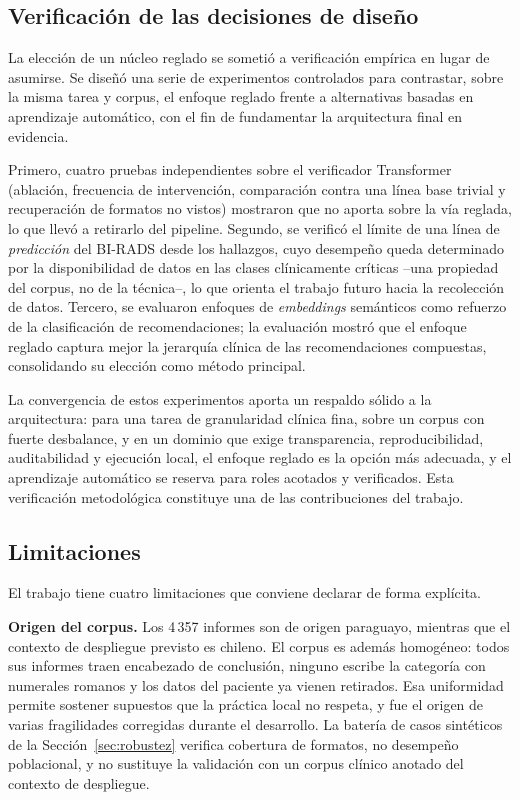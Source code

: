 \documentclass[10pt,journal,a4paper]{IEEEtran}
\begin{document}
\subsection{Verificaci\'on de las decisiones de dise\~no}\label{sec:verif}
La elecci\'on de un n\'ucleo reglado se someti\'o a verificaci\'on emp\'irica en lugar de asumirse. Se dise\~n\'o una serie de experimentos controlados para contrastar, sobre la misma tarea y corpus, el enfoque reglado frente a alternativas basadas en aprendizaje autom\'atico, con el fin de fundamentar la arquitectura final en evidencia.

Primero, cuatro pruebas independientes sobre el verificador Transformer (ablaci\'on, frecuencia de intervenci\'on, comparaci\'on contra una l\'inea base trivial y recuperaci\'on de formatos no vistos) mostraron que no aporta sobre la v\'ia reglada, lo que llev\'o a retirarlo del pipeline. Segundo, se verific\'o el l\'imite de una l\'inea de \emph{predicci\'on} del BI-RADS desde los hallazgos, cuyo desempe\~no queda determinado por la disponibilidad de datos en las clases cl\'inicamente cr\'iticas --una propiedad del corpus, no de la t\'ecnica--, lo que orienta el trabajo futuro hacia la recolecci\'on de datos. Tercero, se evaluaron enfoques de \emph{embeddings} sem\'anticos como refuerzo de la clasificaci\'on de recomendaciones; la evaluaci\'on mostr\'o que el enfoque reglado captura mejor la jerarqu\'ia cl\'inica de las recomendaciones compuestas, consolidando su elecci\'on como m\'etodo principal.

La convergencia de estos experimentos aporta un respaldo s\'olido a la arquitectura: para una tarea de granularidad cl\'inica fina, sobre un corpus con fuerte desbalance, y en un dominio que exige transparencia, reproducibilidad, auditabilidad y ejecuci\'on local, el enfoque reglado es la opci\'on m\'as adecuada, y el aprendizaje autom\'atico se reserva para roles acotados y verificados. Esta verificaci\'on metodol\'ogica constituye una de las contribuciones del trabajo.

\subsection{Limitaciones}\label{sec:limitaciones}
El trabajo tiene cuatro limitaciones que conviene declarar de forma expl\'icita.

\textbf{Origen del corpus.} Los 4\,357 informes son de origen paraguayo, mientras que el contexto de despliegue previsto es chileno. El corpus es adem\'as homog\'eneo: todos sus informes traen encabezado de conclusi\'on, ninguno escribe la categor\'ia con numerales romanos y los datos del paciente ya vienen retirados. Esa uniformidad permite sostener supuestos que la pr\'actica local no respeta, y fue el origen de varias fragilidades corregidas durante el desarrollo. La bater\'ia de casos sint\'eticos de la Secci\'on~\ref{sec:robustez} verifica cobertura de formatos, no desempe\~no poblacional, y no sustituye la validaci\'on con un corpus cl\'inico anotado del contexto de despliegue.
\end{document}
